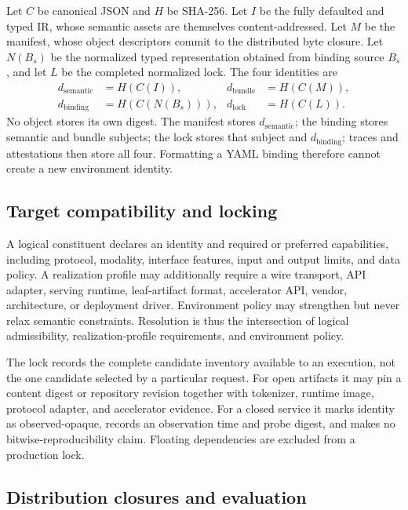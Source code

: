 Let $C$ be canonical JSON and $H$ be SHA-256. Let $I$ be the fully defaulted and
typed IR, whose semantic assets are themselves content-addressed. Let $M$ be
the manifest, whose object descriptors commit to the distributed byte closure.
Let $N(B_s)$ be the normalized typed representation obtained from binding
source $B_s$, and let $L$ be the completed normalized lock. The four identities
are
\begin{equation}
 \begin{aligned}
 d_{\mathrm{semantic}} &= H(C(I)),&
 d_{\mathrm{bundle}}   &= H(C(M)),\\
 d_{\mathrm{binding}}  &= H(C(N(B_s))),&
 d_{\mathrm{lock}}     &= H(C(L)).
 \end{aligned}
 \label{eq:bundle-identities}
\end{equation}
No object stores its own digest. The manifest stores
$d_{\mathrm{semantic}}$; the binding stores semantic and bundle subjects; the
lock stores that subject and $d_{\mathrm{binding}}$; traces and attestations
then store all four. Formatting a YAML binding therefore cannot create a new
environment identity.

\subsection{Target compatibility and locking}

A logical constituent declares an identity and required or preferred
capabilities, including protocol, modality, interface features, input and
output limits, and data policy. A realization profile may additionally require
a wire transport, API adapter, serving runtime, leaf-artifact format,
accelerator API, vendor, architecture, or deployment driver. Environment policy may strengthen but
never relax semantic constraints. Resolution is thus the intersection of
logical admissibility, realization-profile requirements, and environment
policy.

The lock records the complete candidate inventory available to an execution,
not the one candidate selected by a particular request. For open artifacts it
may pin a content digest or repository revision together with tokenizer,
runtime image, protocol adapter, and accelerator evidence. For a closed service
it marks identity as observed-opaque, records an observation time and probe
digest, and makes no bitwise-reproducibility claim. Floating dependencies are
excluded from a production lock.

\subsection{Distribution closures and evaluation}

